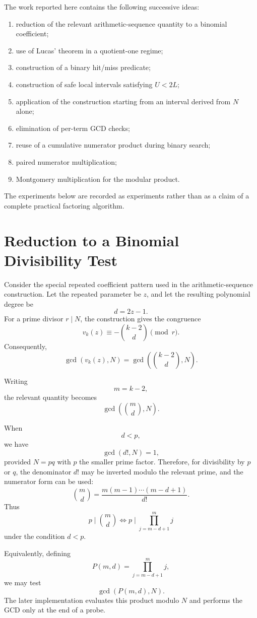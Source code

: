 \documentclass[11pt,a4paper]{article}
\begin{document}
The work reported here contains the following successive ideas:
\begin{enumerate}[leftmargin=2em]
    \item reduction of the relevant arithmetic-sequence quantity to a binomial coefficient;
    \item use of Lucas' theorem in a quotient-one regime;
    \item construction of a binary hit/miss predicate;
    \item construction of safe local intervals satisfying $U<2L$;
    \item application of the construction starting from an interval derived from $N$ alone;
    \item elimination of per-term GCD checks;
    \item reuse of a cumulative numerator product during binary search;
    \item paired numerator multiplication;
    \item Montgomery multiplication for the modular product.
\end{enumerate}

The experiments below are recorded as experiments rather than as a claim of a complete practical factoring algorithm.

\section{Reduction to a Binomial Divisibility Test}

Consider the special repeated coefficient pattern used in the arithmetic-sequence construction. Let the repeated parameter be $z$, and let the resulting polynomial degree be
\[
d=2z-1.
\]
For a prime divisor $r\mid N$, the construction gives the congruence
\[
v_k(z)\equiv -\binom{k-2}{d}\pmod r.
\]
Consequently,
\[
\gcd(v_k(z),N)
=
\gcd\!\left(\binom{k-2}{d},N\right).
\]

Writing
\[
m=k-2,
\]
the relevant quantity becomes
\[
\gcd\!\left(\binom{m}{d},N\right).
\]

When
\[
d<p,
\]
we have
\[
\gcd(d!,N)=1,
\]
provided $N=pq$ with $p$ the smaller prime factor. Therefore, for divisibility by $p$ or $q$, the denominator $d!$ may be inverted modulo the relevant prime, and the numerator form can be used:
\[
\binom{m}{d}
=
\frac{m(m-1)\cdots(m-d+1)}{d!}.
\]
Thus
\[
p\mid\binom{m}{d}
\iff
p\mid \prod_{j=m-d+1}^{m}j
\]
under the condition $d<p$.

Equivalently, defining
\[
P(m,d)=\prod_{j=m-d+1}^{m}j,
\]
we may test
\[
\gcd(P(m,d),N).
\]
The later implementation evaluates this product modulo $N$ and performs the GCD only at the end of a probe.
\end{document}
